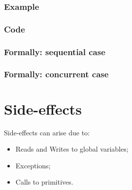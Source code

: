 \documentclass{book}
\begin{document}
  \subsection{Example}

  \subsection{Code}

\begin{emptyformal}
  \subsection{Formally: sequential case}
  
  \subsection{Formally: concurrent case}
\end{emptyformal}


\chapter{Side-effects}

Side-effects can arise due to:
\begin{itemize}
\item Reads and Writes to global variables;
\item Exceptions;
\item Calls to primitives.
\end{itemize}



\end{document}
